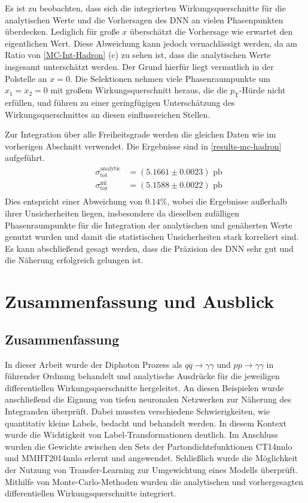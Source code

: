Es ist zu beobachten, dass sich die integrierten Wirkungsquerschnitte für die analytischen Werte und die Vorhersagen des DNN an vielen Phasenpunkten überdecken. Lediglich für große $x$ überschätzt die Vorhersage wie erwartet den eigentlichen Wert. Diese Abweichung kann jedoch vernachlässigt werden, da am Ratio von \textsf{\autoref{MC-Int-Hadron} (c)}  zu sehen ist, dass die analytischen Werte insgesamt unterschätzt werden. Der Grund hierfür liegt vermutlich in der Polstelle an $x=0$. Die Selektionen nehmen viele Phasenraumpunkte um $x_1 = x_2 = 0$ mit großem Wirkungsquerschnitt heraus, die die $p_\text{T}$-Hürde nicht erfüllen, und führen zu einer geringfügigen Unterschätzung des Wirkungsquerschnittes an diesen einflussreichen Stellen.
 
Zur Integration über alle Freiheitsgrade werden die gleichen Daten wie im vorherigen Abschnitt verwendet. Die Ergebnisse sind in \textsf{\autoref{results-mc-hadron}} aufgeführt.
\begin{equation}
\label{results-mc-hadron}
\begin{aligned}
&\sigma_{\text{tot}}^{\text{analytic}}&=  (5.1661 \pm 0.0023) \text{ pb}\\
&\sigma_{\text{tot}}^{\text{ml}} &= (5.1588 \pm 0.0022) \text{ pb} \\
\end{aligned}
\end{equation}
Dies entspricht einer Abweichung von $0.14\%$, wobei die Ergebnisse außerhalb ihrer Unsicherheiten liegen, insbesondere da dieselben zufälligen Phasenraumpunkte für die Integration der analytischen und genäherten Werte genutzt wurden und damit die statistischen Unsicherheiten stark korreliert sind. Es kann abschließend gesagt werden, dass die Präzision des DNN sehr gut und die Näherung erfolgreich gelungen ist.   
\chapter{Zusammenfassung und Ausblick}
\label{5}
\section{Zusammenfassung}
In dieser Arbeit wurde der Diphoton Prozess als $q\overline{q} \rightarrow \gamma \gamma$ und $pp \rightarrow \gamma \gamma$ in führender Ordnung behandelt und analytische Ausdrücke für die jeweiligen differentiellen Wirkungsquerschnitte hergeleitet. An diesen Beispielen wurde anschließend die Eignung von tiefen neuronalen Netzwerken zur Näherung des Integranden überprüft. Dabei mussten verschiedene Schwierigkeiten, wie quantitativ kleine Labels, bedacht und behandelt werden. In diesem Kontext wurde die Wichtigkeit von Label-Transformationen deutlich. Im Anschluss wurden die Gewichte zwischen den Sets der Partondichtefunktionen CT14nnlo und MMHT2014nnlo erlernt und angewendet. Schließlich wurde die Möglichkeit der Nutzung von Transfer-Learning zur Umgewichtung eines Modells überprüft. Mithilfe von Monte-Carlo-Methoden wurden die analytischen und vorhergesagten differentiellen Wirkungsquerschnitte integriert.

